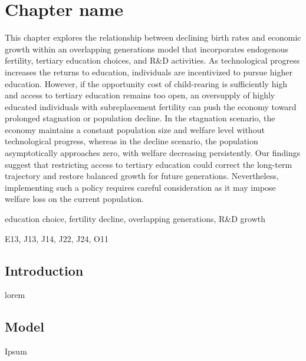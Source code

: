 \chapter{Chapter name}

\label{chap1}


\begin{singlespace}
\begin{chapabstract}
    \noindent This chapter explores the relationship between declining birth rates and economic growth within an overlapping generations model that incorporates endogenous fertility, tertiary education choices, and R\&D activities. As technological progress increases the returns to education, individuals are incentivized to pursue higher education. However, if the opportunity cost of child-rearing is sufficiently high and access to tertiary education remains too open, an oversupply of highly educated individuals with subreplacement fertility can push the economy toward prolonged stagnation or population decline. In the stagnation scenario, the economy maintains a constant population size and welfare level without technological progress, whereas in the decline scenario, the population asymptotically approaches zero, with welfare decreasing persistently. Our findings suggest that restricting access to tertiary education could correct the long-term trajectory and restore balanced growth for future generations. Nevertheless, implementing such a policy requires careful consideration as it may impose welfare loss on the current population.
\end{chapabstract}

	\begin{keywords}
		education choice, fertility decline, overlapping generations, R\&D growth
	\end{keywords}
	\begin{jelclass}
		E13, J13, J14, J22, J24, O11
	\end{jelclass}

\end{singlespace}
\clearpage



\section{Introduction}
lorem

\section{Model}

Ipsum
